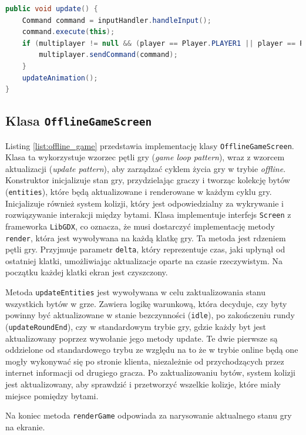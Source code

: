 \begin{lstlisting}[language=Java,style=JavaStyle,label=list:fighter,caption=Funkcja update w klasie Fighter,
                   basicstyle=\footnotesize\ttfamily]
public void update() {
    Command command = inputHandler.handleInput();
    command.execute(this);
    if (multiplayer != null && (player == Player.PLAYER1 || player == Player.PLAYER2)) {
        multiplayer.sendCommand(command);
    }
    updateAnimation();
}
\end{lstlisting}

\subsection{Klasa \texttt{OfflineGameScreen}}
Listing \ref{list:offline_game} przedstawia implementację klasy \texttt{OfflineGameScreen}. Klasa ta wykorzystuje wzorzec pętli gry (\emph{game loop pattern}), wraz z wzorcem aktualizacji (\emph{update pattern}), aby zarządzać cyklem życia gry w trybie \emph{offline}. Konstruktor inicjalizuje stan gry, przydzielając graczy i tworząc kolekcję bytów (\texttt{entities}), które będą aktualizowane i renderowane w każdym cyklu gry. Inicjalizuje również system kolizji, który jest odpowiedzialny za wykrywanie i rozwiązywanie interakcji między bytami. Klasa implementuje interfejs \texttt{Screen} z frameworka \texttt{LibGDX}, co oznacza, że musi dostarczyć implementację metody \texttt{render}, która jest wywoływana na każdą klatkę gry. Ta metoda jest rdzeniem pętli gry. Przyjmuje parametr \texttt{delta}, który reprezentuje czas, jaki upłynął od ostatniej klatki, umożliwiając aktualizacje oparte na czasie rzeczywistym. Na początku każdej klatki ekran jest czyszczony. 

Metoda \texttt{updateEntities} jest wywoływana w celu zaktualizowania stanu wszystkich bytów w grze. Zawiera logikę warunkową, która decyduje, czy byty powinny być aktualizowane w stanie bezczynności (\texttt{idle}), po zakończeniu rundy (\texttt{updateRoundEnd}), czy w standardowym trybie gry, gdzie każdy byt jest aktualizowany poprzez wywołanie jego metody update. Te dwie pierwsze są oddzielone od standardowego trybu ze względu na to że w trybie online będą one mogły wykonywać się po stronie klienta, niezależnie od przychodzących przez internet informacji od drugiego gracza. Po zaktualizowaniu bytów, system kolizji jest aktualizowany, aby sprawdzić i przetworzyć wszelkie kolizje, które miały miejsce pomiędzy bytami. 

Na koniec metoda \texttt{renderGame} odpowiada za narysowanie aktualnego stanu gry na ekranie.


